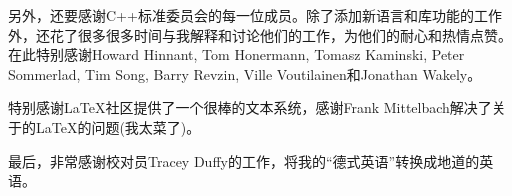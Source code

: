 另外，还要感谢C++标准委员会的每一位成员。除了添加新语言和库功能的工作外，还花了很多很多时间与我解释和讨论他们的工作，为他们的耐心和热情点赞。在此特别感谢Howard Hinnant, Tom Honermann, Tomasz Kaminski, Peter Sommerlad, Tim Song, Barry Revzin, Ville Voutilainen和Jonathan Wakely。

特别感谢LaTeX社区提供了一个很棒的文本系统，感谢Frank Mittelbach解决了关于的\LaTeX{}的问题(我太菜了)。

最后，非常感谢校对员Tracey Duffy的工作，将我的“德式英语”转换成地道的英语。


















